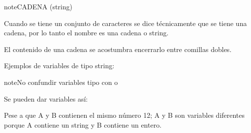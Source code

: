\documentclass[letterpaper,10pt,spanish]{sphinxmanual}
\begin{document}
\begin{sphinxadmonition}{note}{CADENA (string)}

\sphinxAtStartPar
Cuando se tiene un conjunto de caracteres se dice técnicamente que se tiene una cadena, por lo tanto el nombre  es una cadena o string.

\sphinxAtStartPar
El contenido de una cadena se acostumbra encerrarlo entre comillas dobles.

\sphinxAtStartPar
Ejemplos de variables de tipo string:

\begin{sphinxVerbatim}[commandchars=\\\{\},numbers=left,firstnumber=1,stepnumber=1]
  
  
  
  
  
\end{sphinxVerbatim}

\begin{sphinxadmonition}{note}{No confundir variables tipo  con  o }

\sphinxAtStartPar
Se pueden dar variables así:

\begin{sphinxVerbatim}[commandchars=\\\{\},numbers=left,firstnumber=1,stepnumber=1]
  
  
\end{sphinxVerbatim}

\sphinxAtStartPar
Pese a que A y B contienen el mismo número 12; A y B son variables diferentes porque A contiene un string y B contiene un entero.
\end{sphinxadmonition}
\end{sphinxadmonition}
\end{document}
